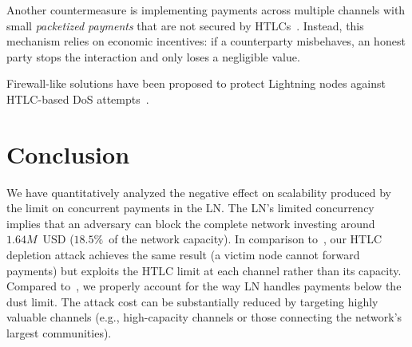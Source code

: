 Another countermeasure is implementing payments across multiple channels with small \textit{packetized payments} that are not secured by HTLCs~\cite{Robinson2019}.
Instead, this mechanism relies on economic incentives: if a counterparty misbehaves, an honest party stops the interaction and only loses a negligible value.

Firewall-like solutions have been proposed to protect Lightning nodes against HTLC-based DoS attempts~\cite{Jager2020}.


\section{Conclusion}

We have quantitatively analyzed the negative effect on scalability produced by the limit on concurrent payments in the LN\@.
The LN's limited concurrency implies that an adversary can block the complete network investing around $1.64M$~USD ($18.5\%$~of the network capacity).
In comparison to~\cite{PerezSola2019}, our HTLC depletion attack achieves the same result (a victim node cannot forward payments) but exploits the HTLC limit at each channel rather than its capacity.
Compared to~\cite{Mizrahi2020}, we properly account for the way LN handles payments below the dust limit.
The attack cost can be substantially reduced by targeting highly valuable channels (e.g., high-capacity channels or those connecting the network's largest communities).
